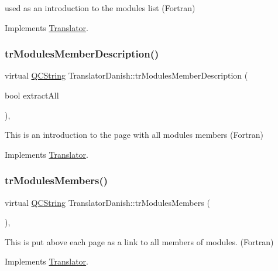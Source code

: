 used as an introduction to the modules list (Fortran) 

Implements \mbox{\hyperlink{class_translator}{Translator}}.

\mbox{\label{class_translator_danish_aa26e0b1eca8077c9c59712c5f09887fb}} 
\subsubsection{\texorpdfstring{trModulesMemberDescription()}{trModulesMemberDescription()}}
{\footnotesize\ttfamily virtual \mbox{\hyperlink{class_q_c_string}{Q\+C\+String}} Translator\+Danish\+::tr\+Modules\+Member\+Description (\begin{DoxyParamCaption}\item[{bool}]{extract\+All }\end{DoxyParamCaption})\hspace{0.3cm}{\ttfamily [inline]}, {\ttfamily [virtual]}}

This is an introduction to the page with all modules members (Fortran) 

Implements \mbox{\hyperlink{class_translator}{Translator}}.

\mbox{\label{class_translator_danish_a9a2de5b46f1ec6faed8208e7c15c1670}} 
\subsubsection{\texorpdfstring{trModulesMembers()}{trModulesMembers()}}
{\footnotesize\ttfamily virtual \mbox{\hyperlink{class_q_c_string}{Q\+C\+String}} Translator\+Danish\+::tr\+Modules\+Members (\begin{DoxyParamCaption}{ }\end{DoxyParamCaption})\hspace{0.3cm}{\ttfamily [inline]}, {\ttfamily [virtual]}}

This is put above each page as a link to all members of modules. (Fortran) 

Implements \mbox{\hyperlink{class_translator}{Translator}}.

